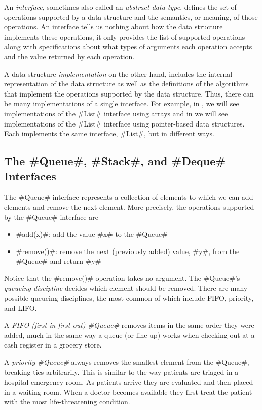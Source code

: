 An \emph{interface}, sometimes also called an \emph{abstract data type},
defines the set of operations supported by a data structure and
the semantics, or meaning, of those operations.  An interface tells us
nothing about how the data structure implements these operations, it only
provides the list of supported operations along with specifications
about what types of arguments each operation accepts and the value
returned by each operation.

A data structure \emph{implementation} on the other hand, includes the
internal representation of the data structure as well as the definitions
of the algorithms that implement the operations supported by the data
structure.  Thus, there can be many implementations of a single interface.
For example, in , we will see implementations of the
#List# interface using arrays and in  we will
see implementations of the #List# interface using pointer-based data
structures.  Each implements the same interface, #List#,
but in different ways.

\subsection{The #Queue#, #Stack#, and #Deque# Interfaces}

The #Queue# interface represents a collection of elements to which we
can add elements and remove the next element.  More precisely, the operations
supported by the #Queue# interface are
\begin{itemize}
  \item #add(x)#: add the value #x# to the #Queue#
  \item #remove()#: remove the next (previously added) value, #y#, from the #Queue# and return #y#
\end{itemize}
Notice that the #remove()# operation takes no argument.  The #Queue#'s
\emph{queueing discipline} decides which element should be removed.
There are many possible queueing disciplines, the most common of which
include FIFO, priority, and LIFO.

A \emph{FIFO (first-in-first-out) #Queue#} removes items in the same
order they were added, much in the same way a queue (or line-up) works
when checking out at a cash register in a grocery store.

A \emph{priority #Queue#} always removes the smallest element from the
#Queue#, breaking ties arbitrarily.  This is similar to the way patients
are triaged in a hospital emergency room.  As patients arrive they are
evaluated and then placed in a waiting room.  When a doctor becomes
available they first treat the patient with the most life-threatening
condition.

